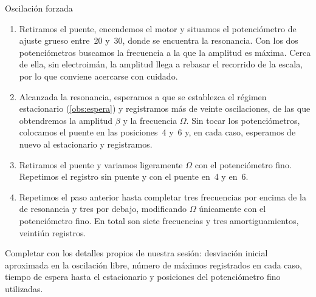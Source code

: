 \documentclass[a4paper,11pt]{amsart}
\makeatletter
\def\subsection{\@startsection{subsection}{2}%
  \z@{.9\linespacing\@plus.6\linespacing}{.3\linespacing}%
  {\normalfont\bfseries\color{azulprof}}}
\numberwithin{equation}{section}
\theoremstyle{cienplano}
\theoremstyle{ciendef}
\theoremstyle{cienobs}
\makeatother
\begin{document}
\subsection{Oscilación forzada}\label{sec:proc-forzada}
\begin{enumerate}
  \item Retiramos el puente, encendemos el motor y situamos el potenciómetro
        de ajuste grueso entre~20 y~30, donde se encuentra la resonancia. Con
        los dos potenciómetros buscamos la frecuencia a la que la amplitud es
        máxima. Cerca de ella, sin electroimán, la amplitud llega a rebasar el
        recorrido de la escala, por lo que conviene acercarse con cuidado.
  \item Alcanzada la resonancia, esperamos a que se establezca el régimen
        estacionario (\cref{obs:espera}) y registramos más de veinte
        oscilaciones, de las que obtendremos la amplitud $\beta$ y la
        frecuencia $\Omega$. Sin tocar los potenciómetros, colocamos el puente
        en las posiciones~4 y~6 y, en cada caso, esperamos de nuevo al
        estacionario y registramos.
  \item Retiramos el puente y variamos ligeramente $\Omega$ con el
        potenciómetro fino. Repetimos el registro sin puente y con el puente
        en~4 y en~6.
  \item Repetimos el paso anterior hasta completar tres frecuencias por
        encima de la de resonancia y tres por debajo, modificando $\Omega$
        únicamente con el potenciómetro fino. En total son siete frecuencias
        y tres amortiguamientos, veintiún registros.
\end{enumerate}

\begin{pendientebox}[Procedimiento]
Completar con los detalles propios de nuestra sesión: desviación inicial
aproximada en la oscilación libre, número de máximos registrados en cada
caso, tiempo de espera hasta el estacionario y posiciones del potenciómetro
fino utilizadas.
\end{pendientebox}
\end{document}
